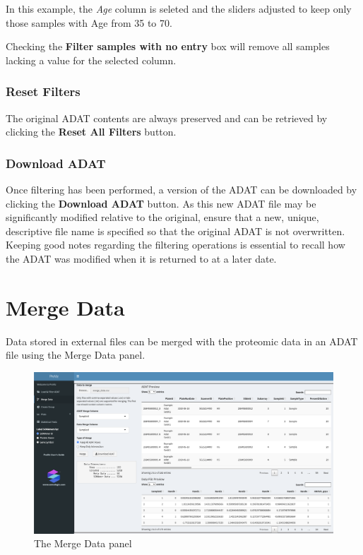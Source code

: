 \documentclass[
]{book}
\begin{document}
In this example, the \emph{Age} column is seleted and the sliders adjusted to keep only those samples with Age from 35 to 70.

Checking the \textbf{Filter samples with no entry} box will remove all samples lacking a value for the selected column.

\hypertarget{reset-filters}{%
\subsection{Reset Filters}\label{reset-filters}}

The original ADAT contents are always preserved and can be retrieved by clicking the \textbf{Reset All Filters} button.

\hypertarget{download-adat}{%
\subsection{Download ADAT}\label{download-adat}}

Once filtering has been performed, a version of the ADAT can be downloaded by clicking the \textbf{Download ADAT} button. As this new ADAT file may be significantly modified relative to the original, ensure that a new, unique, descriptive file name is specified so that the original ADAT is not overwritten. Keeping good notes regarding the filtering operations is essential to recall how the ADAT was modified when it is returned to at a later date.

\hypertarget{merge-data}{%
\chapter{Merge Data}\label{merge-data}}

Data stored in external files can be merged with the proteomic data in an ADAT file using the Merge Data panel.

\begin{figure}
\centering
\includegraphics{images/MergeData.png}
\caption{The Merge Data panel}
\end{figure}
\end{document}
